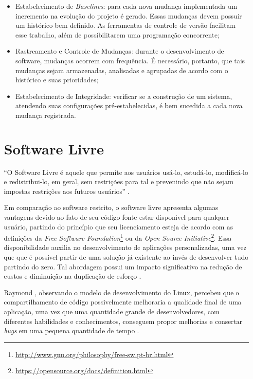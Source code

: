 \begin{itemize}
    \item Estabelecimento de \textit{Baselines}: para cada nova mudança implementada um incremento na evolução do projeto é gerado. Essas mudanças devem possuir um histórico bem definido. As ferramentas de controle de versão facilitam esse trabalho, além de possibilitarem uma programação concorrente;
    \item Rastreamento e Controle de Mudanças: durante o desenvolvimento de software, mudanças ocorrem com frequência. É necessário, portanto, que tais mudanças sejam armazenadas, analisadas e agrupadas de acordo com o histórico e suas prioridades;
    \item Estabelecimento de Integridade: verificar se a construção de um sistema, atendendo suas configurações pré-estabelecidas, é bem sucedida a cada nova mudança registrada.
\end{itemize}

\section{Software Livre}
``O Software Livre é aquele que permite aos usuários usá-lo, estudá-lo, modificá-lo e redistribui-lo, em geral, sem restrições para tal e prevenindo que não sejam impostas restrições aos futuros usuários'' \cite{meirelles2013}.

Em comparação ao software restrito, o software livre apresenta algumas vantagens devido ao fato de seu código-fonte estar disponível para qualquer usuário, partindo do princípio que seu licenciamento esteja de acordo com as definições da \textit{Free Software Foundation}\footnote{\url{http://www.gnu.org/philosophy/free-sw.pt-br.html}} ou da \textit{Open Source Initiative}\footnote{\url{https://opensource.org/docs/definition.html}}. Essa disponibilidade auxilia no desenvolvimento de aplicações personalizadas, uma vez que que é possível partir de uma solução já existente ao invés de desenvolver tudo partindo do zero. Tal abordagem possui um impacto significativo na redução de custos e diminuição na duplicação de esforço \cite{meirelles2013}.

Raymond \cite{raymond1999}, observando o modelo de desenvolvimento do Linux, percebeu que o compartilhamento de código possivelmente melhoraria a qualidade final de uma aplicação, uma vez que uma quantidade grande de desenvolvedores, com diferentes habilidades e conhecimentos, conseguem propor melhorias e consertar \textit{bugs} em uma pequena quantidade de tempo \cite{meirelles2013}.

